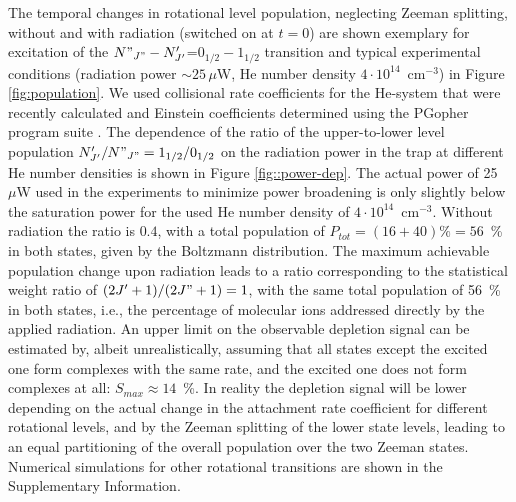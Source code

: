 The temporal changes in rotational level population, neglecting Zeeman splitting, without and with radiation (switched on at $t=0$) are shown exemplary for excitation of the $N"_{J"}-N'_{J'}$=$0_{1/2}-1_{1/2}$ transition and typical experimental conditions (radiation power $\sim 25\,\mu$W, He number density $4\cdot 10^{14}$~cm$^{-3}$) in Figure \ref{fig:population}. We used collisional rate coefficients for the He-\co system that were recently calculated \cite{CO+He_collision} and Einstein coefficients determined using the PGopher program suite \cite{western_pgopher_2017}.
The dependence of the ratio of the upper-to-lower level population  $N'_{J'}/N"_{J"}=1_{1/2}/0_{1/2}$ on the radiation power in the trap at different He number densities is shown in Figure \ref{fig::power-dep}. The actual power of 25~$\mu$W used in the experiments to minimize power broadening is only slightly below the saturation power for the used He number density of $4\cdot 10^{14}$~cm$^{-3}$. Without radiation the ratio is $0.4$, with a total population of $P_{tot}=(16+40)\%=56$~\% in both states, given by the Boltzmann distribution. The maximum achievable population change upon radiation leads to a ratio corresponding to the statistical weight ratio of $(2J'+1)/(2J"+1)=1$, with the same total population of 56~\% in both states, i.e., the percentage of molecular ions addressed directly by the applied radiation. An upper limit on the observable depletion signal can be estimated by, albeit unrealistically, assuming that all states except the excited one form complexes with the same rate, and the excited one does not form complexes at all: $S_{max}\approx 14$~\%. In reality the depletion signal will be lower depending on the actual change in the attachment rate coefficient for different rotational levels, and by the Zeeman splitting of the lower state levels, leading to an equal partitioning of the overall population over the two Zeeman states. Numerical simulations for other rotational transitions are shown in the Supplementary Information.\\

